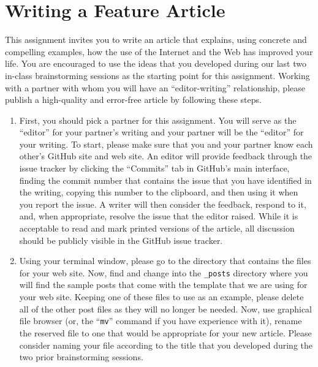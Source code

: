\section*{Writing a Feature Article}

This assignment invites you to write an article that explains, using concrete and compelling examples, how the use of
the Internet and the Web has improved your life. You are encouraged to use the ideas that you developed during our last
two in-class brainstorming sessions as the starting point for this assignment. Working with a partner with whom you will
have an ``editor-writing'' relationship, please publish a high-quality and error-free article by following these steps.

\vspace*{-.1in}

\begin{enumerate}

  \itemsep 0em

  \item First, you should pick a partner for this assignment. You will serve as the ``editor'' for your partner's
    writing and your partner will be the ``editor'' for your writing. To start, please make sure that you and your
    partner know each other's GitHub site and web site. An editor will provide feedback through the issue tracker by
    clicking the ``Commits'' tab in GitHub's main interface, finding the commit number that contains the issue that you
    have identified in the writing, copying this number to the clipboard, and then using it when you report the issue. A
    writer will then consider the feedback, respond to it, and, when appropriate, resolve the issue that the editor
    raised. While it is acceptable to read and mark printed versions of the article, all discussion should be publicly
    visible in the GitHub issue tracker.

  \item Using your terminal window, please go to the directory that contains the files for your web site. Now, find and
    change into the {\tt \_posts} directory where you will find the sample posts that come with the template that we are
    using for your web site. Keeping one of these files to use as an example, please delete all of the other post files
    as they will no longer be needed. Now, use graphical file browser (or, the ``{\tt mv}'' command if you have
    experience with it), rename the reserved file to one that would be appropriate for your new article. Please consider
    naming your file according to the title that you developed during the two prior brainstorming sessions.


\end{enumerate}
